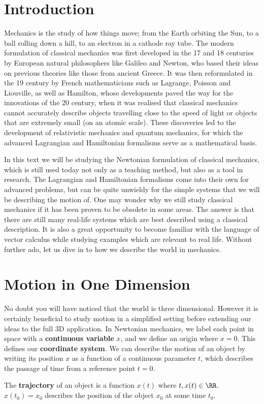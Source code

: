 \documentclass[../classical_mechanics.tex]{subfiles}
\begin{document}
    \section{Introduction}\label{sec:introduction}
        Mechanics is the study of how things move; from the Earth orbiting the Sun, to a ball rolling down a hill, to an electron in a cathode ray tube.
        The modern formulation of classical mechanics was first developed in the 17 and 18 centuries by European natural philosophers like Galileo and Newton, who based their ideas on previous theories like those from ancient Greece.
        It was then reformulated in the 19 century by French mathematicians such as Lagrange, Poisson and Liouville, as well as Hamilton, whose developments paved the way for the innovations of the 20 century, when it was realised that classical mechanics cannot accurately describe objects travelling close to the speed of light or objects that are extremely small (on an atomic scale).
        These discoveries led to the development of relativistic mechanics and quantum mechanics, for which the advanced Lagrangian and Hamiltonian formalisms serve as a mathematical basis.

        In this text we will be studying the Newtonian formulation of classical mechanics, which is still used today not only as a teaching method, but also as a tool in research.
        The Lagrangian and Hamiltonian formalisms come into their own for advanced problems, but can be quite unwieldy for the simple systems that we will be describing the motion of.
        One may wonder why we still study classical mechanics if it has been proven to be obsolete in some areas.
        The answer is that there are still many real-life systems which are best described using a classical description.
        It is also a great opportunity to become familiar with the language of vector calculus while studying examples which are relevant to real life.
        Without further ado, let us dive in to how we describe the world in mechanics.

    \section{Motion in One Dimension}\label{sec:motion-in-one-dimension}
        No doubt you will have noticed that the world is three dimensional.
        However it is certainly beneficial to study motion in a simplified setting before extending our ideas to the full 3D application.
        In Newtonian mechanics, we label each point in space with a \textbf{continuous variable} $x$, and we define an origin where $x=0$.
        This defines our \textbf{coordinate system}.
        We can describe the motion of an object by writing its position $x$ as a function of a continuous parameter $t$, which describes the passage of time from a reference point $t=0$.
        \begin{definition}
            The \textbf{trajectory} of an object is a function $x(t)$ where $t,x(t)\in\RR$. $x(t_0)=x_0$ describes the position of the object $x_0$ at some time $t_0$.
        \end{definition}
\end{document}
